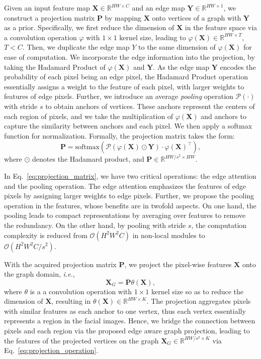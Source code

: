 \documentclass[runningheads]{llncs}
\def\ie{{\it i.e.}}
\def\P{{\mathbf P}}
\def\X{{\mathbf X}}
\def\Y{{\mathbf Y}}
\begin{document}
Given an input feature map $\X \in \mathbb{R}^{HW \times C}$ and an edge map $\Y \in \mathbb{R}^{HW \times 1}$, we construct a projection matrix $\P$ by mapping $\X$ onto vertices of a graph with $\Y$ as a prior. 
Specifically, we first reduce the dimension of $\X$ in the feature space via a convolution operation $\varphi$ with $1 \times 1$ kernel size, leading to $\varphi(\X) \in \mathbb{R}^{HW \times T} $, $T < C$. 
Then, we duplicate the edge map $Y$ to the same dimension of $\varphi(\X)$ for ease of computation. 
We incorporate the edge information into the projection, by taking the Hadamard Product of $\varphi(\X)$ and $\Y$. 
As the edge map $\Y$ encodes the probability of each pixel being an edge pixel, the Hadamard Product operation essentially assigns a weight to the feature of each pixel, with larger weights to features of edge pixels. 
Further,  we introduce an average {\it pooling} operation $\mathcal P(\cdot)$ with stride $s$ to obtain anchors of vertices. 
These anchors represent the centers of each region of pixels, and we take the multiplication of $\varphi(\X)$ and anchors to capture the similarity between anchors and each pixel. 
We then apply a softmax function for normalization. 
Formally, the projection matrix takes the form:
\begin{equation}
 \P = \text{softmax}\left(\mathcal{P}(\varphi(\X) \odot \Y) \cdot \varphi(\X)^{\top}\right),
 \label{eq:projection_matrix}
\end{equation}
where $\odot$ denotes the Hadamard product, and $\P \in \mathbb{R}^{HW/s^2 \times HW}$. 

In Eq.~\eqref{eq:projection_matrix}, we have two critical operations: the edge attention and the pooling operation. 
The edge attention emphasizes the features of edge pixels by assigning larger weights to edge pixels.
Further, we propose the pooling operation in the features, whose benefits are in twofold aspects. 
On one hand, the pooling leads to compact representations by averaging over features to remove the redundancy. 
On the other hand, by pooling with stride $s$, the computation complexity is reduced from $\mathcal{O}(H^2W^2C)$ in non-local modules to $\mathcal{O}(H^2W^2C/s^2)$.

With the acquired projection matrix $\P$, we project the pixel-wise features $\X$ onto the graph domain, \ie, 
\begin{equation}
    \X_G = \P\theta(\X),
    \label{eq:projection_operation}
\end{equation}
where $\theta$ is a a convolution operation with $ 1 \times 1$ kernel size so as to reduce the dimension of $\X$, resulting in $\theta(\X) \in \mathbb{R}^{HW \times K}$.
The projection aggregates pixels with similar features as each anchor to one vertex, thus each vertex essentially represents a region in the facial images. 
Hence, we bridge the connection between pixels and each region via the proposed edge aware graph projection, leading to the features of the projected vertices on the graph $\X_G \in \mathbb{R}^{HW/s^2 \times K}$ via Eq.~\eqref{eq:projection_operation}. 
\end{document}
